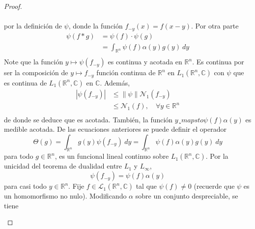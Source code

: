 \documentclass[12pt]{report}
\newcounter{it}
\theoremstyle{largebreak}
\renewcommand{\leq}{\ensuremath{\leqslant}}
\newcommand\abs[1]{\ensuremath{\left|#1\right|}}
\newcommand\norm[1]{\ensuremath{\|#1\|}}
\newcommand{\N}[2]{\ensuremath{\mathcal{N}_{#1}\left(#2\right)}}
\begin{document}
\begin{proof}
\begin{enumerate}
\begin{equation*}
\begin{split}
                \end{split}
            \end{equation*}
            por la definición de $\psi$, donde la función $f_{ -y}(x)=f(x-y)$. Por otra parte
            \begin{equation*}
                \begin{split}
                    \psi(f*g)&=\psi(f)\cdot\psi(g)\\
                    &=\int_{\mathbb{R}^n}\psi(f)\alpha(y)g(y)\:dy\\
                \end{split}
            \end{equation*}
            Note que la función $y\mapsto\psi(f_{ -y})$ es continua y acotada en $\mathbb{R}^n$. Es continua por ser la composición de $y\mapsto f_ {-y}$ función continua de $\mathbb{R}^n$ en $L_1(\mathbb{R}^n,\mathbb{C})$ con $\psi$ que es continua de $L_1(\mathbb{R}^n,\mathbb{C})$ en $\mathbb{C}$. Además,
            \begin{equation*}
                \begin{split}
                    \abs{\psi(f_{ -y})}&\leq\norm{\psi}\N{1}{f_{ -y}}\\
                    &\leq\N{1}{f},\quad\forall y\in\mathbb{R}^n\\
                \end{split}
            \end{equation*}
            de donde se deduce que es acotada. También, la función $y¸mapsto\psi(f)\alpha(y)$ es medible acotada. De las ecuaciones anteriores se puede definir el operador
            \begin{equation*}
                \Theta(g)=\int_{\mathbb{R}^n} g(y)\psi(f_{ -y})\:dy=\int_{\mathbb{R}^n}\psi(f)\alpha(y)g(y)\:dy
            \end{equation*}
            para todo $g\in\mathbb{R}^n$, es un funcional lineal continuo sobre $L_1(\mathbb{R}^n,\mathbb{C})$. Por la unicidad del teorema de dualidad entre $L_1$ y $L_\infty$,
            \begin{equation*}
                \psi(f_{ -y})=\psi(f)\alpha(y)
            \end{equation*}
            para casi todo $y\in\mathbb{R}^n$. Fije $f\in\mathcal{L}_1(\mathbb{R}^n,\mathbb{C})$ tal que $\psi(f)\neq0$ (recuerde que $\psi$ es un homomorfismo no nulo). Modificando $\alpha$ sobre un conjunto despreciable, se tiene
            \begin{equation*}

\end{equation*}
\end{enumerate}
\end{proof}
\end{document}
